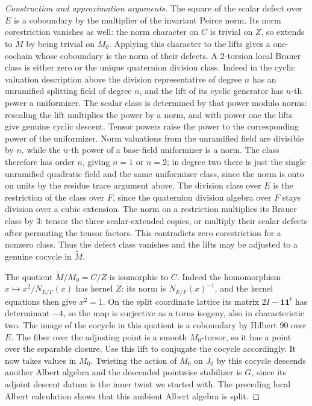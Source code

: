 \documentclass[11pt,a4paper,openany,oneside]{book}
\theoremstyle{resultstyle}
\theoremstyle{definition}
\numberwithin{equation}{chapter}
\begin{document}
\begin{proof}[Construction and approximation arguments]
The square of the scalar defect over \(E\) is a coboundary by
the multiplier of the invariant Peirce norm. Its norm
corestriction vanishes as well: the norm character on \(C\)
is trivial on \(Z\), so extends to \(\widetilde M\) by being
trivial on \(M_0\). Applying this character to the lifts gives a
one-cochain whose coboundary is the norm of their defects.
A \(2\)-torsion local Brauer class is either zero or the unique
quaternion division class. Indeed in the cyclic valuation description
above the division representative of degree \(n\) has an unramified
splitting field of degree \(n\), and the lift of its cyclic generator
has \(n\)-th power a uniformizer. The scalar class is determined by
that power modulo norms: rescaling the lift multiplies the power
by a norm, and with power one the lifts give genuine cyclic descent.
Tensor powers raise the power to the corresponding power of the
uniformizer. Norm valuations from the unramified field are divisible
by \(n\), while the \(n\)-th power of a base-field uniformizer is
a norm. The class therefore has order \(n\), giving \(n=1\) or
\(n=2\); in degree two there is just the single unramified quadratic
field and the same uniformizer class, since the norm is onto
on units by the residue trace argument above. The division class
over \(E\) is the restriction of the class over \(F\), since the
quaternion division algebra over \(F\) stays division over a cubic
extension. The norm on a
restriction multiplies its Brauer class by \(3\): tensor the
three scalar-extended copies, or multiply their scalar
defects after permuting the tensor factors. This contradicts
zero corestriction for a nonzero class. Thus the defect class
vanishes and the lifts may be adjusted to a genuine cocycle
in \(\widetilde M\).

The quotient \(\widetilde M/M_0=C/Z\) is isomorphic to \(C\).
Indeed the homomorphism \(x\mapsto x^2/N_{E/F}(x)\) has kernel
\(Z\): its norm is \(N_{E/F}(x)^{-1}\), and the kernel equations
then give \(x^2=1\). On the split coordinate lattice its matrix
\(2I-\mathbf 1\mathbf 1^t\) has determinant \(-4\), so the map is
surjective as a torus isogeny, also in characteristic two.
The image of the cocycle in this quotient is a coboundary by
Hilbert 90 over \(E\). The fiber over the adjusting point is a
smooth \(M_0\)-torsor, so it has a point over the separable
closure. Use this lift to conjugate the cocycle accordingly. It now takes values in
\(M_0\). Twisting the action of \(M_0\) on \(J_0\) by this cocycle
descends another Albert algebra and the descended pointwise
stabilizer is \(G\), since its adjoint descent datum is the inner
twist we started with. The preceding local Albert calculation
shows that this ambient Albert algebra is split.


\end{proof}
\end{document}
